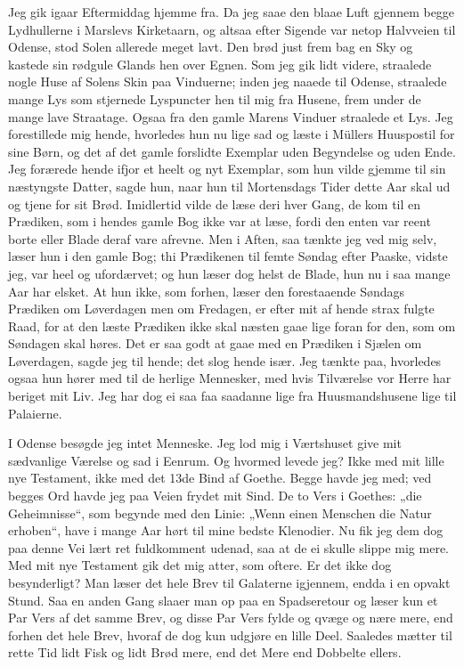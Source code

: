 \documentclass[12pt,a4paper]{book}
\newcommand{\apage}[1]{\marginnote{\footnotesize\textit{[#1]}}}
\begin{document}
Jeg gik igaar Eftermiddag hjemme fra. Da jeg saae den blaae Luft
gjennem begge Lydhullerne i Marslevs Kirketaarn, og altsaa efter
Sigende var netop Halvveien til Odense, stod Solen allerede meget lavt.
Den brød just frem bag en Sky og kastede sin rødgule Glands hen over
Egnen. Som jeg gik lidt videre, straalede nogle Huse af Solens Skin paa
Vinduerne; inden jeg naaede til Odense, straalede mange Lys som
stjernede Lyspuncter hen til mig fra Husene,
frem \apage{2}  under de mange lave Straatage. Ogsaa fra den gamle Marens Vinduer
straalede et Lys. Jeg forestillede mig hende, hvorledes hun nu lige sad
og læste i Müllers Huuspostil for sine Børn, og det af det gamle
forslidte Exemplar uden Begyndelse og uden Ende. Jeg forærede hende
ifjor et heelt og nyt Exemplar, som hun vilde gjemme til sin næstyngste
Datter, sagde hun, naar hun til Mortensdags Tider dette Aar skal ud og
tjene for sit Brød. Imidlertid vilde de læse deri hver Gang, de kom til
en Prædiken, som i hendes gamle Bog ikke var at læse, fordi den enten
var reent borte eller Blade deraf vare afrevne. Men i Aften, saa tænkte
jeg ved mig selv, læser hun i den gamle Bog; thi Prædikenen til femte
Søndag efter Paaske, vidste jeg, var heel og ufordærvet; og hun læser
dog helst de Blade, hun nu i saa mange Aar har elsket. At hun ikke, som
forhen, læser den forestaaende Søndags Prædiken om Løverdagen men om
Fredagen, er efter mit af hende strax fulgte Raad, for at den læste
Prædiken ikke skal næsten gaae lige foran for den, som om Søndagen skal
høres. Det er saa godt at gaae med en Prædiken i Sjælen om Løverdagen,
sagde jeg til hende; det slog hende især. Jeg tænkte paa, hvorledes
ogsaa hun hører med til de herlige Mennesker, med hvis Tilværelse vor
Herre har beriget mit
Liv. \apage{3}  Jeg har dog ei saa faa saadanne lige fra Huusmandshusene lige til
Palaierne.

I Odense besøgde jeg intet Menneske. Jeg lod mig i Værtshuset give mit
sædvanlige Værelse og sad i Eenrum. Og hvormed levede jeg? Ikke med mit
lille nye Testament, ikke med det 13de Bind af Goethe. Begge havde jeg
med; ved begges Ord havde jeg paa Veien frydet mit Sind. De to Vers i
Goethes: „die Geheimnisse“, som begynde med den Linie: „Wenn einen
Menschen die Natur erhoben“, have i mange Aar hørt til mine bedste
Klenodier. Nu fik jeg dem dog paa denne Vei lært ret fuldkomment
udenad, saa at de ei skulle slippe mig mere. Med mit nye Testament gik
det mig atter, som oftere. Er det ikke dog besynderligt? Man læser det
hele Brev til Galaterne igjennem, endda i en opvakt Stund. Saa en anden
Gang slaaer man op paa en Spadseretour og læser kun et Par Vers af det
samme Brev, og disse Par Vers fylde og qvæge og nære mere, end forhen
det hele Brev, hvoraf de dog kun udgjøre en lille Deel. Saaledes mætter
til rette Tid lidt Fisk og lidt Brød mere, end det Mere end Dobbelte
ellers.
\end{document}
